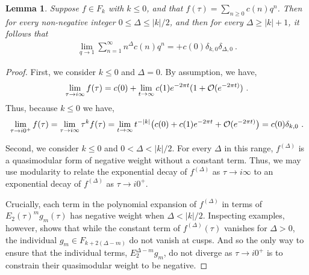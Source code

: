 \documentclass[11pt,a4paper]{article}
\newtheorem{lem}[thm]{Lemma}
\begin{document}
\begin{lem}\label{thm:nSumN}
Suppose $f \in F_k$ with $k \leq 0$, and that $f(\tau) = \sum_{n \geq 0} c(n) q^n$. Then for every non-negative integer $0 \leq \Delta \leq |k|/2$, and then for every $\Delta \geq |k|+1$, it follows that 
\begin{align}
\lim_{q \to 1} \sum_{n = 1}^{\infty} n^{\Delta} c(n) q^n = +c(0) \delta_{k,0} \delta_{\Delta,0}~\label{s=NbN}.
\end{align}
\end{lem}

\begin{proof}
First, we consider $k \leq 0$ and $\Delta = 0$. By assumption, we have,
\begin{align}
\lim_{\tau \to i \infty} f(\tau) = c(0) + \lim_{t \to \infty} c(1) e^{-2 \pi t} (1 + {\cal O}(e^{-2\pi t)})~.
\end{align}
Thus, because $k \leq 0$ we have,
\begin{align}
\lim_{\tau \to i 0^+} f(\tau) = \lim_{\tau \to i \infty} \tau^{k} f(\tau) = \lim_{t \to \infty} t^{-|k|} \big( c(0) + c(1) e^{-2 \pi t} +  {\cal O}(e^{-2\pi t)} \big) = c(0)\delta_{k,0}~.
\end{align}

Second, we consider $k \leq 0$ and $0< \Delta < |k|/2$. For every $\Delta$ in this range, $f^{(\Delta)}$ is a quasimodular form of negative weight without a constant term. Thus, we may use modularity to relate the exponential decay of $f^{(\Delta)}$ as $\tau \to i \infty$ to an exponential decay of $f^{(\Delta)}$ as $\tau \to i 0^+$. 

Crucially, each term in the polynomial expansion of $f^{(\Delta)}$ in terms of $E_2(\tau)^m g_m(\tau)$ has negative weight when $\Delta < |k|/2$. Inspecting examples, however, shows that while the constant term of $f^{(\Delta)}(\tau)$ vanishes for $\Delta > 0$, the individual $g_m \in F_{k + 2 (\Delta - m)}$ do not vanish at cusps. And so the only way to ensure that the individual terms, $E_2^{\Delta - m} g_m$, do not diverge as $\tau \to i 0^+$ is to constrain their quasimodular weight to be negative.


\end{proof}
\end{document}
